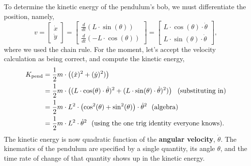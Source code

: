 To determine the kinetic energy of the pendulum's bob, we must differentiate the position, namely,
\begin{equation}
\label{eq:PendulumVelocity}
    v = \left[\begin{array}{r} \dot{x} \\ \dot{y} \end{array}\right] = 
    \left[\begin{array}{c} \frac{d}{dt}  \left( L \cdot \sin(\theta) \right)\\ \frac{d}{dt} \left(- L  \cdot  \cos(\theta)  \right)\end{array}\right] = 
    \left[\begin{array}{c} L \cdot \cos(\theta) \cdot \dot{\theta}\\ 
    L \cdot \sin(\theta) \cdot \dot{\theta}\end{array}\right],
\end{equation}
where we used the chain rule. For the moment, let's accept the velocity calculation as being correct, and compute the kinetic energy,
\begin{equation}
\label{eq:KEpendulum}
\begin{aligned}
    K_{\rm pend} &= \frac{1}{2} m \cdot \left( (\dot{x})^2 + (\dot{y})^2) \right) \\
    & =  \frac{1}{2} m \cdot \left( (L \cdot \cos(\theta) \cdot \dot{\theta})^2 + (L \cdot \sin(\theta) \cdot \dot{\theta})^2) \right) ~~(\text{substituting in})\\
     &= \frac{1}{2} m \cdot L^2 \cdot \left( \cos^2(\theta) + \sin^2(\theta) \right) \cdot \dot{\theta}^2 ~~(\text{algebra})\\
     &= \frac{1}{2} m \cdot L^2 \cdot \dot{\theta}^2 ~~(\text{using the one trig identity everyone knows}).
\end{aligned}
\end{equation}
The kinetic energy is now quadratic function of the \textbf{angular velocity}, $\dot{\theta}$. The kinematics of the pendulum are specified by a single quantity, its angle $\theta$, and the time rate of change of that quantity shows up in the kinetic energy. 

